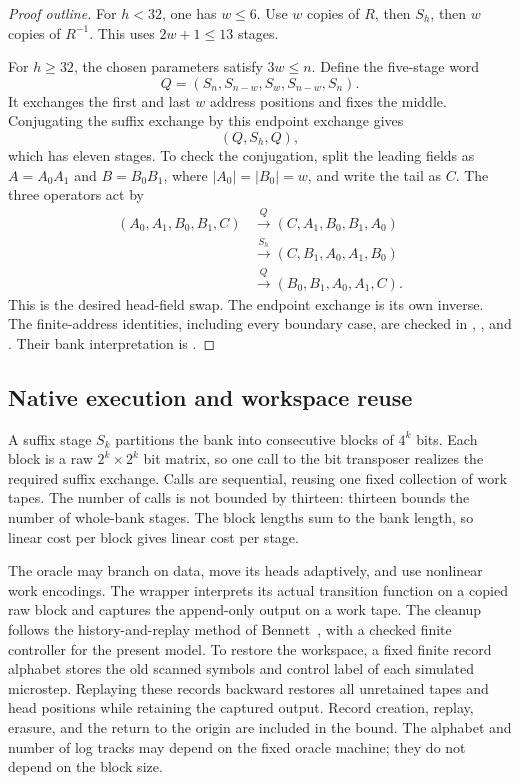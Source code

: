 \begin{proof}[Proof outline]
For $h<32$, one has $w\leq6$. Use $w$ copies of $R$, then $S_h$, then
$w$ copies of $R^{-1}$. This uses $2w+1\leq13$ stages.

For $h\geq32$, the chosen parameters satisfy $3w\leq n$. Define the
five-stage word
\[
                   Q=(S_n,S_{n-w},S_w,S_{n-w},S_n).
\]
It exchanges the first and last $w$ address positions and fixes the middle.
Conjugating the suffix exchange by this endpoint exchange gives
\[
                            (Q,S_h,Q),
\]
which has eleven stages. To check the conjugation, split the leading
fields as $A=A_0A_1$ and $B=B_0B_1$, where $|A_0|=|B_0|=w$,
and write the tail as $C$. The three operators act by
\[
\begin{aligned}
 (A_0,A_1,B_0,B_1,C)&\xrightarrow{Q}(C,A_1,B_0,B_1,A_0)\\
 &\xrightarrow{S_h}(C,B_1,A_0,A_1,B_0)\\
 &\xrightarrow{Q}(B_0,B_1,A_0,A_1,C).
\end{aligned}
\]
This is the desired head-field swap. The endpoint exchange is its own
inverse. The finite-address identities, including every
boundary case, are checked in ,
, and . Their bank
interpretation is .
\end{proof}

\subsection{Native execution and workspace reuse}
A suffix stage $S_k$ partitions the bank into consecutive blocks of $4^k$
bits. Each block is a raw $2^k\times2^k$ bit matrix, so one call to the bit
transposer realizes the required suffix exchange. Calls are sequential,
reusing one fixed collection of work tapes. The number of calls is not
bounded by thirteen: thirteen bounds the number of whole-bank stages.
The block lengths sum to the bank length, so linear cost per block gives
linear cost per stage.

The oracle may branch on data, move its heads adaptively, and use nonlinear
work encodings. The wrapper interprets its actual transition function on a
copied raw block and captures the append-only output on a work tape. The cleanup follows the history-and-replay method of
Bennett~\cite{Bennett1973},
with a checked finite controller for the present model. To restore the workspace,
a fixed finite record alphabet stores the old scanned
symbols and control label of each simulated microstep. Replaying these records
backward restores all unretained tapes and head positions while retaining the
captured output. Record creation, replay, erasure, and the return to the
origin are included in the bound. The alphabet and number of log tracks may
depend on the fixed oracle machine; they do not depend on the block size.

